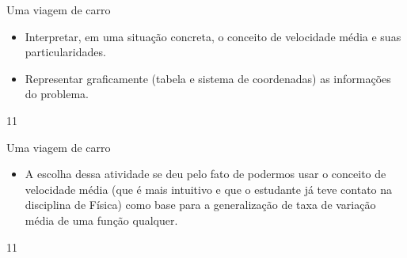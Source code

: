 \begin{objectives}{Uma viagem de carro}
{
\begin{itemize}

\item Interpretar, em uma situação concreta, o conceito de velocidade média e suas particularidades.

\item Representar graficamente (tabela e sistema de coordenadas) as informações do problema.

\end{itemize}
}{1}{1}
\end{objectives}
\marginpar{\vspace{-2em}}
\begin{sugestions}{Uma viagem de carro}
{
\begin{itemize}
\item A escolha dessa atividade se deu pelo fato de podermos usar o conceito de velocidade
média (que é mais intuitivo e que o estudante já teve contato na disciplina de Física)
como base para a generalização de taxa de variação média de uma função qualquer.
\end{itemize}
}{1}{1}
\end{sugestions}
